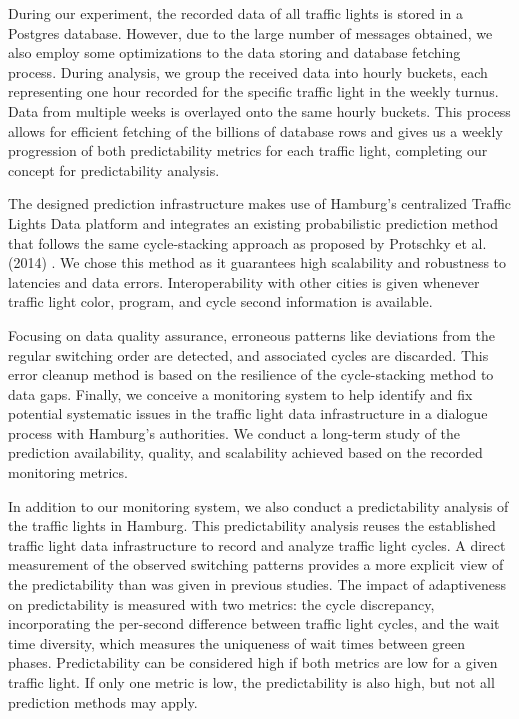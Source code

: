 During our experiment, the recorded data of all traffic lights is stored in a Postgres database. However, due to the large number of messages obtained, we also employ some optimizations to the data storing and database fetching process. During analysis, we group the received data into hourly buckets, each representing one hour recorded for the specific traffic light in the weekly turnus. Data from multiple weeks is overlayed onto the same hourly buckets. This process allows for efficient fetching of the billions of database rows and gives us a weekly progression of both predictability metrics for each traffic light, completing our concept for predictability analysis.

\begin{Summary}
The designed prediction infrastructure makes use of Hamburg's centralized Traffic Lights Data platform and integrates an existing probabilistic prediction method  \cite{pape_untersuchung_2012} that follows the same cycle-stacking approach as proposed by Protschky et al. (2014) \cite{protschky_extensive_2014, protschky_adaptive_2014}. We chose this method as it guarantees high scalability and robustness to latencies and data errors. Interoperability with other cities is given whenever traffic light color, program, and cycle second information is available.

Focusing on data quality assurance, erroneous patterns like deviations from the regular switching order are detected, and associated cycles are discarded. This error cleanup method is based on the resilience of the cycle-stacking method to data gaps. Finally, we conceive a monitoring system to help identify and fix potential systematic issues in the traffic light data infrastructure in a dialogue process with Hamburg's authorities. We conduct a long-term study of the prediction availability, quality, and scalability achieved based on the recorded monitoring metrics.

In addition to our monitoring system, we also conduct a predictability analysis of the traffic lights in Hamburg. This predictability analysis reuses the established traffic light data infrastructure to record and analyze traffic light cycles. A direct measurement of the observed switching patterns provides a more explicit view of the predictability than was given in previous studies. The impact of adaptiveness on predictability is measured with two metrics: the cycle discrepancy, incorporating the per-second difference between traffic light cycles, and the wait time diversity, which measures the uniqueness of wait times between green phases. Predictability can be considered high if both metrics are low for a given traffic light. If only one metric is low, the predictability is also high, but not all prediction methods may apply.
\end{Summary}

